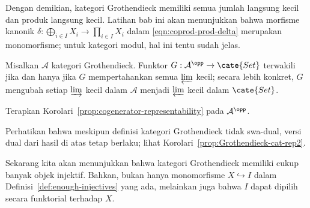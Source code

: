 Dengan demikian, kategori Grothendieck memiliki semua jumlah langsung kecil
dan produk langsung kecil. Latihan bab ini akan menunjukkan bahwa morfisme
kanonik $\delta:\bigoplus_{i\in I}X_i\to\prod_{i\in I}X_i$ dalam
\eqref{eqn:coprod-prod-delta} merupakan monomorfisme; untuk kategori modul,
hal ini tentu sudah jelas.

\begin{korolari}\label{prop:Grothendieck-cat-rep1}
Misalkan $\mathcal{A}$ kategori Grothendieck. Funktor
$G:\mathcal{A}^{\opp}\to\cate{Set}$ terwakili jika dan hanya jika $G$
mempertahankan semua $\varprojlim$ kecil; secara lebih konkret, $G$ mengubah
setiap $\varinjlim$ kecil dalam $\mathcal{A}$ menjadi $\varprojlim$ kecil dalam
$\cate{Set}$.
\end{korolari}
\begin{bukti}
Terapkan Korolari~\ref{prop:cogenerator-representability} pada
$\mathcal{A}^{\opp}$.
\end{bukti}

Perhatikan bahwa meskipun definisi kategori Grothendieck tidak swa-dual, versi
dual dari hasil di atas tetap berlaku; lihat
Korolari~\ref{prop:Grothendieck-cat-rep2}.

Sekarang kita akan menunjukkan bahwa kategori Grothendieck memiliki cukup
banyak objek injektif. Bahkan, bukan hanya
monomorfisme $X\hookrightarrow I$ dalam Definisi~\ref{def:enough-injectives}
yang ada, melainkan juga bahwa $I$ dapat dipilih secara funktorial terhadap
$X$.

